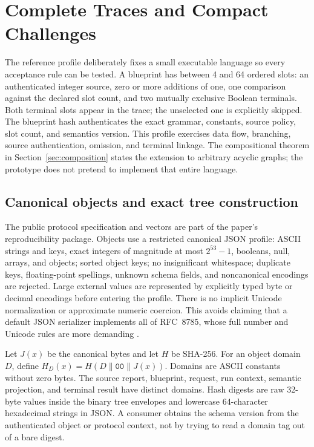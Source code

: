 \section{Complete Traces and Compact Challenges}
\label{sec:merkle}

The reference profile deliberately fixes a small executable language so every acceptance rule can be tested. A blueprint has between 4 and 64 ordered slots: an authenticated integer source, zero or more additions of one, one comparison against the declared slot count, and two mutually exclusive Boolean terminals. Both terminal slots appear in the trace; the unselected one is explicitly skipped. The blueprint hash authenticates the exact grammar, constants, source policy, slot count, and semantics version. This profile exercises data flow, branching, source authentication, omission, and terminal linkage. The compositional theorem in Section~\ref{sec:composition} states the extension to arbitrary acyclic graphs; the prototype does not pretend to implement that entire language.

\subsection{Canonical objects and exact tree construction}

The public protocol specification and vectors are part of the paper's reproducibility package. Objects use a restricted canonical JSON profile: ASCII strings and keys, exact integers of magnitude at most $2^{53}-1$, booleans, null, arrays, and objects; sorted object keys; no insignificant whitespace; duplicate keys, floating-point spellings, unknown schema fields, and noncanonical encodings are rejected. Large external values are represented by explicitly typed byte or decimal encodings before entering the profile. There is no implicit Unicode normalization or approximate numeric coercion. This avoids claiming that a default JSON serializer implements all of RFC~8785, whose full number and Unicode rules are more demanding \cite{rfc8785}.

Let $J(x)$ be the canonical bytes and let $H$ be SHA-256. For an object domain $D$, define $H_D(x)=H(D\|\mathtt{00}\|J(x))$. Domains are ASCII constants without zero bytes. The source report, blueprint, request, run context, semantic projection, and terminal result have distinct domains. Hash digests are raw 32-byte values inside the binary tree envelopes and lowercase 64-character hexadecimal strings in JSON. A consumer obtains the schema version from the authenticated object or protocol context, not by trying to read a domain tag out of a bare digest.

